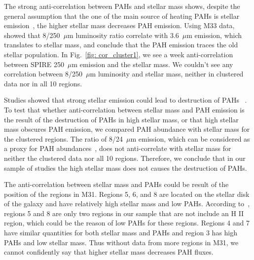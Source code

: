         The strong anti-correlation between PAHs and stellar mass shows, despite the general assumption that the one of the main source of heating PAHs is stellar emission~\citep[e.g][]{Haas02,Bendo08,Calapa14, Lu14,Jones15}, the higher stellar mass decreases PAH emission.
        Using M33 data,~\cite{Calapa14} showed that 8/250~$\mu$m luminosity ratio correlate with 3.6~$\mu$m emission, which translates to stellar mass, and conclude that the PAH emission traces the old stellar population.
        In Fig.~\ref{fig: cor_cluster1}, we see a week anti-correlation between SPIRE 250~$\mu$m emission and the stellar mass.
        We couldn't see any correlation between 8/250~$\mu$m luminosity and stellar mass, neither in clustered data nor in all 10 regions.
        
        Studies showed that strong stellar emission could lead to destruction of PAHs ~\citep[e.g.][]{Clayton03,Seok14}.
        To test that whether anti-correlation between stellar mass and PAH emission is the result of the destruction of PAHs in high stellar mass, or that high stellar mass obscures PAH emission, we compared PAH abundance with stellar mass for the clustered regions.
        The ratio of 8/24~$\mu$m emission, which can be considered as a proxy for PAH abundances~\citep[e.g.][]{Sandstrom10,Khramtsova13}, does not anti-correlate with stellar mass for neither the clustered data nor all 10 regions.
        Therefore, we conclude that in our sample of studies the high stellar mass does not causes the destruction of PAHs.
        
        The anti-correlation between stellar mass and PAHs could be result of the position of the regions in M31.
        Regions 5, 6, and 8 are located on the stellar disk of the galaxy and have relatively high stellar mass and low PAHs. 
        According to~\cite{Dim15}, regions 5 and 8 are only two regions in our sample that are not include an H {\sc II} region, which could be the reason of low PAHs for these regions.
        Regions 4 and 7 have similar quantities for both stellar mass and PAHs and region 3 has high PAHs and low stellar mass.
        Thus without data from more regions in M31, we cannot confidently say that higher stellar mass decreases PAH fluxes.
        

